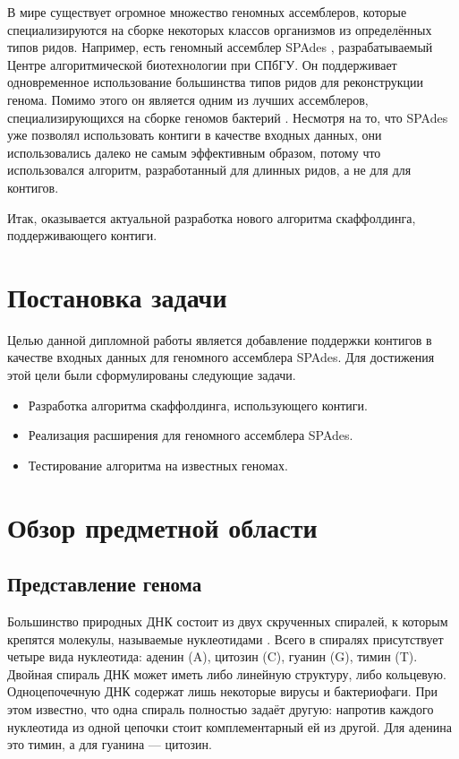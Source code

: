 \documentclass[14pt]{matmex-diploma-custom}
\begin{document}
\begin{sloppypar}
В мире существует огромное множество геномных ассемблеров, которые специализируются на сборке некоторых классов организмов из определённых типов ридов. Например, есть геномный ассемблер SPAdes \cite{art:SPAdes}, разрабатываемый Центре алгоритмической биотехнологии при \mbox{СПбГУ}. Он поддерживает одновременное использование большинства типов ридов для реконструкции генома. Помимо этого он является одним из лучших ассемблеров, специализирующихся на сборке геномов бактерий \cite{art:assemblers_cmp}. Несмотря на то, что SPAdes уже позволял использовать контиги в качестве входных данных, они использовались далеко не самым эффективным образом, потому что использовался алгоритм, разработанный для длинных ридов, а не для для контигов.
\end{sloppypar}

Итак, оказывается актуальной разработка нового алгоритма скаффолдинга, поддерживающего контиги.

\section{Постановка задачи}
Целью данной дипломной работы является добавление поддержки контигов в качестве входных данных для геномного ассемблера SPAdes. Для достижения этой цели были сформулированы следующие задачи.
\begin{itemize}
    \item Разработка алгоритма скаффолдинга, использующего
контиги.
    \item Реализация расширения для геномного ассемблера SPAdes.
    \item Тестирование алгоритма на известных геномах.
\end{itemize}

\section{Обзор предметной области}
\subsection{Представление генома}
Большинство природных ДНК состоит из двух скрученных спиралей, к которым крепятся молекулы, называемые нуклеотидами \cite{art:Watson}. Всего в спиралях присутствует четыре вида нуклеотида: аденин (A), цитозин (C), гуанин (G), тимин (T). Двойная спираль ДНК может иметь либо линейную структуру, либо кольцевую. Одноцепочечную ДНК содержат лишь некоторые вирусы и бактериофаги. При этом известно, что одна спираль полностью задаёт другую: напротив каждого нуклеотида из одной цепочки стоит комплементарный ей из другой. Для аденина это тимин, а для гуанина --- цитозин.
\end{document}
